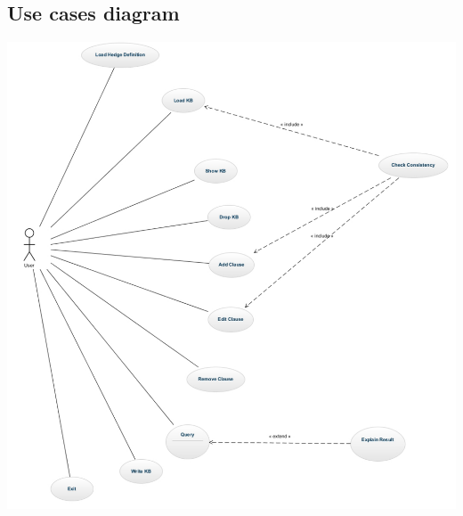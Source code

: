 \documentclass[26pt,fleqn,]{article}
\begin{document}
\subsection{Use cases diagram}
\includegraphics[scale=0.45]{UsecaseDiagram}
\end{document}
